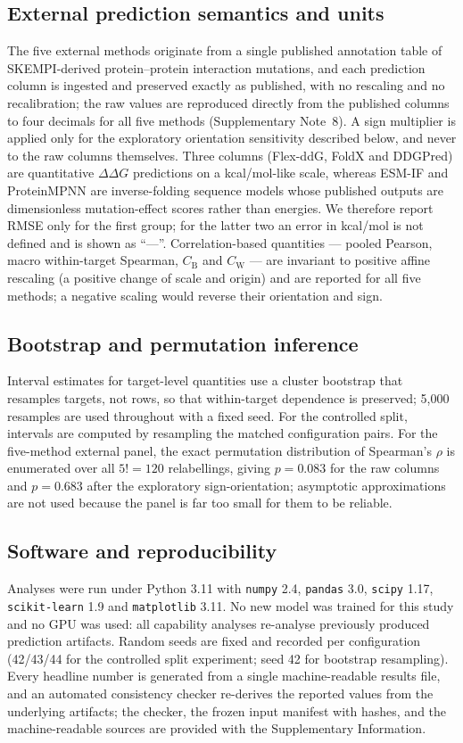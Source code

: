 \documentclass[11pt,a4paper]{article}
\begin{document}
\subsection*{External prediction semantics and units}
The five external methods originate from a single published annotation table of
SKEMPI-derived protein--protein interaction mutations, and each prediction column is ingested and preserved
exactly as published, with no rescaling and no recalibration; the raw values are reproduced
directly from the published columns to four decimals for all five methods (Supplementary
Note~8). A sign multiplier is applied only for the exploratory orientation sensitivity
described below, and never to the raw columns themselves. Three columns (Flex-ddG, FoldX and DDGPred) are quantitative
$\Delta\Delta G$ predictions on a kcal/mol-like scale, whereas ESM-IF and ProteinMPNN are
inverse-folding sequence models whose published outputs are dimensionless mutation-effect
scores rather than energies. We therefore report RMSE only for the first group; for the
latter two an error in kcal/mol is not defined and is shown as ``---''. Correlation-based
quantities --- pooled Pearson, macro within-target Spearman, $C_{\mathrm{B}}$ and
$C_{\mathrm{W}}$ --- are invariant to positive affine rescaling (a positive change of scale and origin)
and are reported for all five methods; a negative scaling would reverse their
orientation and sign.

\subsection*{Bootstrap and permutation inference}
Interval estimates for target-level quantities use a cluster bootstrap that resamples
targets, not rows, so that within-target dependence is preserved; 5{,}000 resamples are used
throughout with a fixed seed. For the controlled split, intervals are computed by resampling
the matched configuration pairs. For the five-method external panel, the exact permutation
distribution of Spearman's $\rho$ is enumerated over all $5! = 120$ relabellings, giving
$p = 0.083$ for the raw columns and $p = 0.683$ after the
exploratory sign-orientation; asymptotic approximations are not used because the panel is
far too small for them to be reliable.

\subsection*{Software and reproducibility}
Analyses were run under Python 3.11 with \texttt{numpy} 2.4, \texttt{pandas} 3.0,
\texttt{scipy} 1.17, \texttt{scikit-learn} 1.9 and \texttt{matplotlib} 3.11. No new model was
trained for this study and no GPU was used: all capability analyses re-analyse previously
produced prediction artifacts. Random seeds are fixed and recorded per configuration
(42/43/44 for the controlled split experiment; seed 42 for bootstrap resampling). Every
headline number is generated from a single machine-readable results file, and an automated
consistency checker re-derives the reported values from the underlying artifacts; the
checker, the frozen input manifest with hashes, and the machine-readable sources are
provided with the Supplementary Information.
\end{document}
